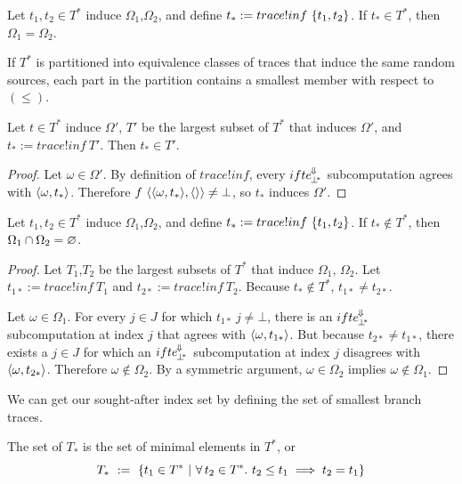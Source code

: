 \begin{corollary}
Let $t_1,t_2 \in T^*$ induce $\Omega_1$,$\Omega_2$, and define $t_* := trace!inf~\{{t_1,t_2}\}$.
If $t_* \in T^*$, then $\Omega_1 = \Omega_2$.
\end{corollary}

If $T^*$ is partitioned into equivalence classes of traces that induce the same random sources, each part in the partition contains a smallest member with respect to $(\leq)$.

\begin{theorem}
Let $t \in T^*$ induce $\Omega'$, $T'$ be the largest subset of $T^*$ that induces $\Omega'$, and $t_* := trace!inf~T'$.
Then $t_* \in T'$.
\end{theorem}
\begin{proof}
Let $\omega \in \Omega'$.
By definition of $trace!inf$, every $ifte^{\mspace{-2mu}\Downarrow\mspace{-2mu}}_{\mspace{-2mu}{\bot^{\mspace{-4mu}*}}}$ subcomputation agrees with $\langle{\omega,t_*}\rangle$.
Therefore $f~\langle{\langle{\omega,t_*}\rangle,\langle{}\rangle}\rangle \neq \bot$, so $t_*$ induces $\Omega'$.
\end{proof}

\begin{theorem}
Let $t_1,t_2 \in T^*$ induce $\Omega_1$,$\Omega_2$, and define $t_* := trace!inf~\{{t_1,t_2}\}$.
If $t_* \notin T^*$, then $\Omega_1 \cap \Omega_2 = \varnothing$.
\end{theorem}
\begin{proof}
Let $T_1$,$T_2$ be the largest subsets of $T^*$ that induce $\Omega_1$, $\Omega_2$.
Let $t_{1*} := trace!inf~T_1$ and $t_{2*} := trace!inf~T_2$.
Because $t_* \notin T^*$, $t_{1*} \neq t_{2*}$.

Let $\omega \in \Omega_1$.
For every $j \in J$ for which $t_{1*}~j \neq \bot$, there is an $ifte^{\mspace{-2mu}\Downarrow\mspace{-2mu}}_{\mspace{-2mu}{\bot^{\mspace{-4mu}*}}}$ subcomputation at index $j$ that agrees with $\langle{\omega,t_{1*}}\rangle$.
But because $t_{2*} \neq t_{1*}$, there exists a $j \in J$ for which an $ifte^{\mspace{-2mu}\Downarrow\mspace{-2mu}}_{\mspace{-2mu}{\bot^{\mspace{-4mu}*}}}$ subcomputation at index $j$ disagrees with $\langle{\omega,t_{2*}}\rangle$.
Therefore $\omega \notin \Omega_2$.
By a symmetric argument, $\omega \in \Omega_2$ implies $\omega \notin \Omega_1$.
\end{proof}

We can get our sought-after index set by defining the set of smallest branch traces.

\begin{definition}
The set of  $T_*$ is the set of minimal elements in $T^*$, or
\begin{equation}
	T_*\ :=\ \lbrace {t_1 \in T^*} \ \lvert\ {\forall\,{t_2 \in T^*}\ldotp\, t_2 \leq t_1 \implies t_2 = t_1} \rbrace
\end{equation}
\end{definition}

